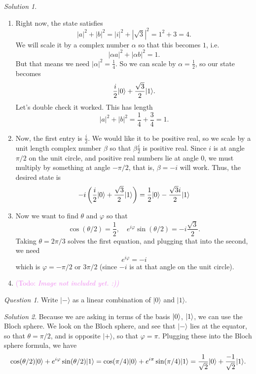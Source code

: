 \documentclass{article}
\theoremstyle{plain}
\theoremstyle{definition}
\theoremstyle{remark}
\newtheorem{question}[theorem]{Question}
\newtheorem*{solution}{Solution}
\numberwithin{theorem}{section}
\newcommand{\KS}[1]{\textcolor{violet}{{\sf (Todo:} {\sl{#1})}}}
\newcommand{\KS}[1]{}
\begin{document}
\begin{solution}
    \begin{enumerate}
        \item Right now, the state satisfies
        \[
        |a|^2 + |b|^2 = |i|^2 + |\sqrt{3}|^2 = 1^2 + 3 = 4.
        \]
        We will scale it by a complex number $\alpha$ so that this becomes $1$, i.e.
        \[
        |\alpha a|^2 + |\alpha b|^2 = 1.
        \]
        But that means we need $|\alpha|^2 = \frac{1}{4}$.  So we can scale by $\alpha = \frac{1}{2}$, so our state becomes
        \[
        \frac{i}{2} |0 \rangle + \frac{\sqrt{3}}{2} |1\rangle.
        \]
        Let's double check it worked.  This has length
        \[
        |a|^2 + |b|^2 = \frac{1}{4} + \frac{3}{4} = 1.
        \]
        \item Now, the first entry is $\frac{i}{2}$.  We would like it to be positive real, so we scale by a unit length complex number $\beta$ so that $\beta \frac{i}{2}$ is positive real.  Since $i$ is at angle $\pi/2$ on the unit circle, and positive real numbers lie at angle $0$, we must multiply by something at angle $-\pi/2$, that is, $\beta = -i$ will work.  Thus, the desired state is
        \[
        -i \left( \frac{i}{2} |0 \rangle + \frac{\sqrt{3}}{2} |1\rangle   \right)
        =
        \frac{1}{2} |0 \rangle - \frac{\sqrt{3}i}{2} |1\rangle
        \]

        \item Now we want to find $\theta$ and $\varphi$ so that
        \[
        \cos(\theta/2) = \frac{1}{2}, \quad
        e^{i\varphi} \sin(\theta/2) = -i \frac{\sqrt{3}}{2}.
        \]
        Taking $\theta = 2\pi/3$ solves the first equation, and plugging that into the second, we need
        \[
        e^{i\varphi} = -i
        \]
        which is $\varphi = -\pi/2$ or $3\pi/2$ (since $-i$ is at that angle on the unit circle).
        \item \KS{Image not included yet. :)}
    \end{enumerate}
\end{solution}

\begin{question} 
Write $|-\rangle$ as a linear combination of $|0\rangle$ and $|1\rangle$.
\end{question}

\begin{solution}
Because we are asking in terms of the basis $|0 \rangle$, $|1\rangle$, we can use the Bloch sphere.
    We look on the Bloch sphere, and see that $|-\rangle$ lies at the equator, so that $\theta = \pi/2$, and is opposite $|+\rangle$, so that $\varphi = \pi$.  Plugging these into the Bloch sphere formula, we have
    \[
     \cos(\theta/2) |0 \rangle
     + e^{i \varphi} \sin(\theta/2) |1\rangle
     = 
     \cos(\pi/4) |0 \rangle + e^{i\pi} \sin(\pi/4) |1\rangle
     =
     \frac{1}{\sqrt{2}} |0 \rangle + \frac{-1}{\sqrt{2}} |1\rangle.
    \]
\end{solution}
\end{document}
